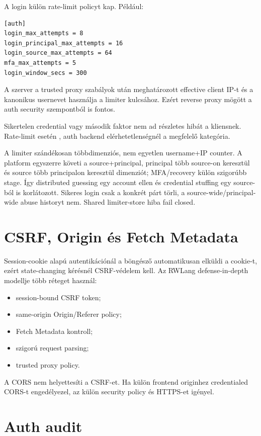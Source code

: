 A login külön rate-limit policyt kap. Például:

\begin{lstlisting}
[auth]
login_max_attempts = 8
login_principal_max_attempts = 16
login_source_max_attempts = 64
mfa_max_attempts = 5
login_window_secs = 300
\end{lstlisting}

A szerver a trusted proxy szabályok után meghatározott effective client IP-t és a kanonikus usernevet használja a limiter kulcsához. Ezért reverse proxy mögött a  auth security szempontból is fontos.

Sikertelen credential vagy második faktor nem ad részletes hibát a kliensnek. Rate-limit esetén , auth backend elérhetetlenségnél  a megfelelő kategória.

A limiter szándékosan többdimenziós, nem egyetlen username+IP counter. A platform egyszerre követi a source+principal, principal több source-on keresztül és source több principalon keresztül dimenziót; MFA/recovery külön szigorúbb stage. Így distributed guessing egy account ellen és credential stuffing egy source-ból is korlátozott. Sikeres login csak a konkrét párt törli, a source-wide/principal-wide abuse historyt nem. Shared limiter-store hiba fail closed.

\section{CSRF, Origin és Fetch Metadata}

Session-cookie alapú autentikációnál a böngésző automatikusan elküldi a cookie-t, ezért state-changing kérésnél CSRF-védelem kell. Az RWLang defense-in-depth modellje több réteget használ:

\begin{itemize}
  \item session-bound CSRF token;
  \item same-origin Origin/Referer policy;
  \item Fetch Metadata kontroll;
  \item szigorú request parsing;
  \item trusted proxy policy.
\end{itemize}

A CORS nem helyettesíti a CSRF-et. Ha külön frontend originhez credentialed CORS-t engedélyezel, az külön security policy és HTTPS-et igényel.

\section{Auth audit}

